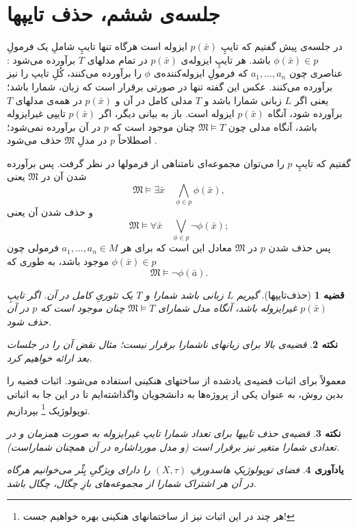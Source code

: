\documentclass[12pt,a4paper]{article}
\theoremstyle{colorhead}
\newtheorem{thm}{قضیه}
\newtheorem{nokte}[thm]{نکته}
\newtheorem{yad}[thm]{یادآوری}
\begin{document}
\section{جلسه‌ی ششم، حذف تایپها}
در جلسه‌ی پیش گفتیم که تایپِ
$p(\bar{x})$
ایزوله است هرگاه تنها تایپِ شاملِ
یک فرمولِ
$\phi(\bar{x})\in p$
باشد.
هر تایپِ
ایزوله‌ی
$p(\bar{x})$
در تمام مدلهای
$T$
برآورده 
می‌شود
:
عناصری چون
$a_1,\ldots,a_n$
که فرمولِ
ایزوله‌کننده‌ی
$\phi$
را برآورده می‌کنند، کُلِ تایپ را نیز برآورده می‌کنند. عکس این گفته تنها در صورتی برقرار است که زبان، شمارا باشد؛ یعنی
اگر
$L$
زبانی شمارا باشد و 
$T$
مدلی کامل در آن و
$p(\bar{x})$
در همه‌ی مدلهای 
$T$
برآورده شود، آنگاه 
$p(\bar{x})$
ایزوله است. باز به بیانی دیگر، اگر
$p(\bar{x})$
تایپی غیرایزوله باشد، آنگاه مدلی
چون
$\mathfrak{M}\models T$
چنان موجود است که 
$p$
در آن برآورده نمی‌شود؛ اصطلاحاً
$p$
در مدلِ
$\mathfrak{M}$
حذف می‌شود
.
\par 
گفتیم که تایپِ
$p$
را می‌توان مجموعه‌ای نامتناهی از فرمولها در نظر گرفت. 
پس برآورده شدن آن در
$\mathfrak{M}$
یعنی
\[
\mathfrak{M}\models \exists \bar{x}\quad \bigwedge_{\phi\in p} \phi(\bar{x}),
\]
و حذف شدن آن یعنی
\[
\mathfrak{M}\models \forall\bar{x}\quad \bigvee_{\phi\in p}\neg \phi(\bar{x});
\]
پس حذف شدن 
$p$
در
$\mathfrak{M}$
معادل این است که برای هر
$a_1,\ldots,a_n\in M$
فرمولی چون
$\phi(\bar{x})\in p$
موجود باشد، به طوری که
\[
\mathfrak{M}\models  \neg \phi(\bar{a}).
\]
\begin{thm}[حذف‌تایپها]
گیریم
$L$
زبانی باشد شمارا و 
$T$
یک تئوریِ
کامل در آن. اگر تایپِ
$p(\bar{x})$
غیرایزوله باشد، آنگاه مدل شمارای 
$\mathfrak{M}\models T$
چنان موجود است که 
$p$
در آن حذف شود.
\end{thm}
\begin{nokte}
قضیه‌ی بالا برای زبانهای ناشمارا برقرار نیست؛ مثال نقض آن را در جلسات بعد ارائه خواهیم کرد. 
\end{nokte}
معمولاً برای اثبات قضیه‌ی یادشده از ساختهای هنکینی استفاده می‌شود. اثبات قضیه را بدین روش، 
به عنوان یکی از پروژه‌ها به دانشجویان واگذاشته‌ایم تا در این جا به اثباتی 
توپولوژیک 
\footnote{هر چند در این اثبات نیز از ساختمانهای هنکینی بهره خواهیم جست!}
بپردازیم. 
\begin{nokte}
قضیه‌ی حذف تایپها
برای تعداد شمارا تایپ غیرایزوله به صورت همزمان  و در تعدادی شمارا متغیر نیز برقرار است (و مدل مورداشاره‌ در آن همچنان شماراست).
\end{nokte}
\begin{yad}
فضای توپولوژیکِ هاسدورفِ
$(X,\tau)$
را دارای ویژگیِ
بِئْر
می‌خوانیم هرگاه در آن هر اشتراک شمارا از مجموعه‌های بازِ چگال، چگال باشد.
\end{yad}
\end{document}
